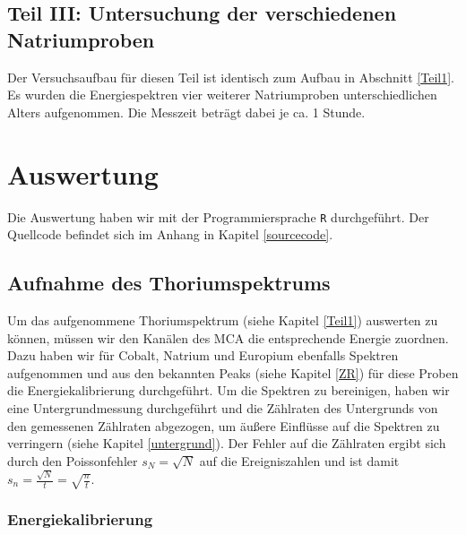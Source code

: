 \documentclass[12pt,listof=totoc]{scrartcl}
\newcommand{\code}[1]{\texttt{#1}}
\begin{document}
\subsection{Teil III: Untersuchung der verschiedenen Natriumproben}

Der Versuchsaufbau für diesen Teil ist identisch zum Aufbau in Abschnitt \ref{Teil1}.
Es wurden die Energiespektren vier weiterer Natriumproben unterschiedlichen Alters aufgenommen. Die Messzeit beträgt dabei je ca. 1 Stunde.


\newpage
\section{Auswertung}Die Auswertung haben wir mit der Programmiersprache \code{R} durchgeführt. Der Quellcode befindet sich im Anhang in Kapitel \ref{sourcecode}.
\subsection{Aufnahme des Thoriumspektrums}\label{thoriumspektrum}
Um das aufgenommene Thoriumspektrum (siehe Kapitel \ref{Teil1}) auswerten zu können, müssen wir den Kanälen des MCA die entsprechende Energie zuordnen. Dazu haben wir für Cobalt, Natrium und Europium ebenfalls Spektren aufgenommen und aus den bekannten Peaks (siehe Kapitel \ref{ZR}) für diese Proben die Energiekalibrierung durchgeführt. Um die Spektren zu bereinigen, haben wir eine Untergrundmessung durchgeführt und die Zählraten des Untergrunds von den gemessenen Zählraten abgezogen, um äußere Einflüsse auf die Spektren zu verringern (siehe Kapitel \ref{untergrund}). Der Fehler auf die Zählraten ergibt sich durch den Poissonfehler $s_N=\sqrt{N}$ auf die Ereigniszahlen und ist damit $s_n=\frac{\sqrt{N}}{t}=\sqrt{\frac{n}{t}}$.\\

\newpage
\subsubsection{Energiekalibrierung}\label{calibration}
\end{document}
